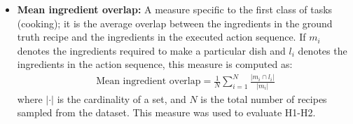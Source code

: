 \begin{itemize}
    \item \textbf{Mean ingredient overlap:} A measure specific to the first class of tasks (cooking); it is the average overlap between the ingredients in the ground truth recipe and the ingredients in the executed action sequence. If $m_i$ denotes the ingredients required to make a particular dish and $l_i$ denotes the ingredients in the action sequence, this measure is computed as: 
    \vspace{-0.75em}   
    \begin{align}
        \label{eqn:mean-overlap}    
        \text{Mean ingredient overlap} = \frac{1}{N} \sum_{i=1}^{N} \frac{|m_i \cap l_i|}{|m_i|}
    \end{align}
    where $| \cdot |$ is the cardinality of a set, and $N$ is the total number of recipes sampled from the dataset.  This measure was used to evaluate H1-H2.   
    
\end{itemize}




